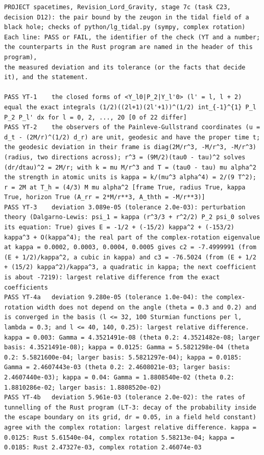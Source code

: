 \documentclass[
  10pt,
]{article}
\begin{document}
\begin{verbatim}
PROJECT spacetimes, Revision_Lord_Gravity, stage 7c (task C23, decision D12): the pair bound by the zeugon in the tidal field of a black hole; checks of python/lg_tidal.py (sympy, complex rotation)
Each line: PASS or FAIL, the identifier of the check (YT and a number; the counterparts in the Rust program are named in the header of this program),
the measured deviation and its tolerance (or the facts that decide it), and the statement.

PASS YT-1    the closed forms of <Y_l0|P_2|Y_l'0> (l' = l, l + 2) equal the exact integrals (1/2)((2l+1)(2l'+1))^(1/2) int_{-1}^{1} P_l P_2 P_l' dx for l = 0, 2, ..., 20 [0 of 22 differ]
PASS YT-2    the observers of the Painleve-Gullstrand coordinates (u = d_t - (2M/r)^(1/2) d_r) are unit, geodesic and have the proper time t; the geodesic deviation in their frame is diag(2M/r^3, -M/r^3, -M/r^3) (radius, two directions across); r^3 = (9M/2)(tau0 - tau)^2 solves (dr/dtau)^2 = 2M/r; with k = mu M/r^3 and T = (tau0 - tau) mu alpha^2 the strength in atomic units is kappa = k/(mu^3 alpha^4) = 2/(9 T^2); r = 2M at T_h = (4/3) M mu alpha^2 [frame True, radius True, kappa True, horizon True (A_rr = 2*M/r**3, A_thth = -M/r**3)]
PASS YT-3    deviation 3.089e-05 (tolerance 2.0e-03): perturbation theory (Dalgarno-Lewis: psi_1 = kappa (r^3/3 + r^2/2) P_2 psi_0 solves its equation: True) gives E = -1/2 + (-15/2) kappa^2 + (-153/2) kappa^3 + O(kappa^4); the real part of the complex-rotation eigenvalue at kappa = 0.0002, 0.0003, 0.0004, 0.0005 gives c2 = -7.4999991 (from (E + 1/2)/kappa^2, a cubic in kappa) and c3 = -76.5024 (from (E + 1/2 + (15/2) kappa^2)/kappa^3, a quadratic in kappa; the next coefficient is about -7219): largest relative difference from the exact coefficients
PASS YT-4a   deviation 9.280e-05 (tolerance 1.0e-04): the complex-rotation width does not depend on the angle (theta = 0.3 and 0.2) and is converged in the basis (l <= 32, 100 Sturmian functions per l, lambda = 0.3; and l <= 40, 140, 0.25): largest relative difference. kappa = 0.003: Gamma = 4.3521491e-08 (theta 0.2: 4.3521482e-08; larger basis: 4.3521491e-08); kappa = 0.0125: Gamma = 5.5821298e-04 (theta 0.2: 5.5821600e-04; larger basis: 5.5821297e-04); kappa = 0.0185: Gamma = 2.4607443e-03 (theta 0.2: 2.4608021e-03; larger basis: 2.4607440e-03); kappa = 0.04: Gamma = 1.8808540e-02 (theta 0.2: 1.8810286e-02; larger basis: 1.8808520e-02)
PASS YT-4b   deviation 5.961e-03 (tolerance 2.0e-02): the rates of tunnelling of the Rust program (LT-3: decay of the probability inside the escape boundary on its grid, dr = 0.05, in a field held constant) agree with the complex rotation: largest relative difference. kappa = 0.0125: Rust 5.61540e-04, complex rotation 5.58213e-04; kappa = 0.0185: Rust 2.47327e-03, complex rotation 2.46074e-03

\end{verbatim}
\end{document}
